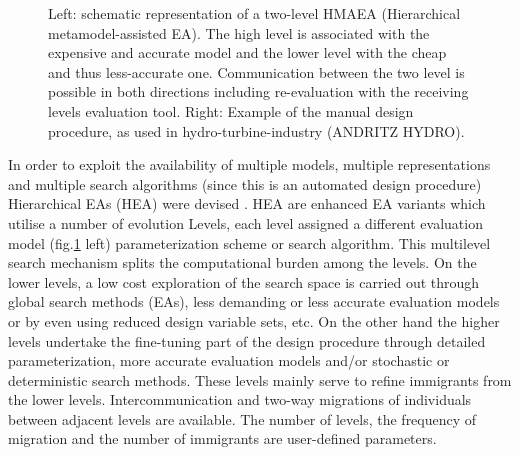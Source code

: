 \begin{figure}[h!]
\begin{minipage}[b]{1.0\linewidth}
 \centering
\end{minipage}
\caption{Left: schematic representation of a two-level HMAEA (Hierarchical metamodel-assisted EA). The high level is associated with the expensive and accurate model and the lower level with the cheap and thus less-accurate one. Communication between the two level is possible in both directions including re-evaluation with the receiving levels evaluation tool. Right: Example of the manual design procedure, as used in hydro-turbine-industry (ANDRITZ HYDRO).}
\label{HMAEA}
\end{figure} 
 
In order to exploit the availability of multiple models, multiple representations and multiple search algorithms (since this is an automated design procedure) Hierarchical EAs (HEA) were devised \cite{Herr1999, Sefr2000, Desid2003, LTT_2_031, LTT_3_092, LTT_2_036,
LTT_2_044, LTT_2_048, LTT_4_05}. HEA are enhanced EA variants which utilise a number of evolution Levels, each level assigned a different evaluation model (fig.\ref{HMAEA} left) parameterization scheme or search algorithm. This multilevel search mechanism splits the computational burden among the levels. On the lower levels, a low cost exploration of the search space is carried out through global search methods (EAs), less demanding or less accurate evaluation models or by even using reduced design variable sets, etc. On the other hand the higher levels undertake the fine-tuning part of the design procedure through detailed parameterization, more accurate evaluation models and/or stochastic or deterministic search methods. These levels mainly serve to refine immigrants from the lower levels. Intercommunication and two-way migrations of individuals between adjacent levels are available. The number of levels, the frequency of migration and the number of immigrants are user-defined parameters.

